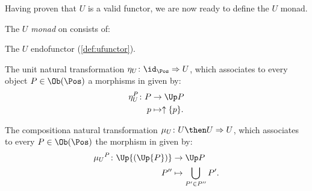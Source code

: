 Having proven that $U$ is a valid functor, we are now ready to define the $U$ monad.
\begin{definition}[$U$ monad]
The \emph{$U$ monad} on \Pos consists of:
\begin{compactenum}
    \item The $U$ endofunctor (\cref{def:ufunctor}).
    \item The unit natural transformation $\eta_U \colon \id_{\Pos}\Rightarrow U$, which associates to every object $P\in \Ob(\Pos)$ a morphisms in \Pos given by:
    \begin{equation}
        \begin{aligned}
            \eta_{U}^P\colon P &\to \Up P\\
            p&\mapsto \uparrow \{p\}.
        \end{aligned}
    \end{equation}
\item The compositiona natural transformation $\mu_U\colon U\then U\Rightarrow U$, which associates to every $P\in \Ob(\Pos)$ the morphism in \Pos given by:
\begin{equation}
    \begin{aligned}
    \mu{_U}^P\colon \Up{(\Up{P})}&\to \Up P\\
    P''&\mapsto \bigcup_{P'\in P''}P'.
    \end{aligned}
\end{equation}
\end{compactenum}
\end{definition}

